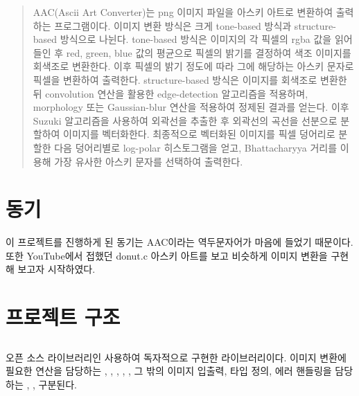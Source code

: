 \documentclass[conference]{IEEEtran}
\begin{document}
\maketitle

\begin{abstract}
AAC(Ascii Art Converter)는 png 이미지 파일을 아스키 아트로 변환하여 출력하는 프로그램이다.
이미지 변환 방식은 크게 tone-based 방식과 structure-based 방식으로 나뉜다.
tone-based 방식은 이미지의 각 픽셀의 rgba 값을 읽어들인 후 red, green, blue 값의 평균으로 픽셀의 밝기를 결정하여 색조 이미지를 회색조로 변환한다.
이후 픽셀의 밝기 정도에 따라 그에 해당하는 아스키 문자로 픽셀을 변환하여 출력한다.
structure-based 방식은 이미지를 회색조로 변환한 뒤 convolution 연산을 활용한 edge-detection 알고리즘을 적용하며, morphology 또는 Gaussian-blur 연산을 적용하여 정제된 결과를 얻는다.
이후 Suzuki 알고리즘을 사용하여 외곽선을 추출한 후 외곽선의 곡선을 선분으로 분할하여 이미지를 벡터화한다.
최종적으로 벡터화된 이미지를 픽셀 덩어리로 분할한 다음 덩어리별로 log-polar 히스토그램을 얻고, Bhattacharyya 거리를 이용해 가장 유사한 아스키 문자를 선택하여 출력한다.
\end{abstract}

\section{동기}
이 프로젝트를 진행하게 된 동기는 AAC이라는 역두문자어가 마음에 들었기 때문이다.
또한 YouTube에서 접했던 donut.c\cite[text]{keylist} 아스키 아트를 보고 비슷하게 이미지 변환을 구현해 보고자 시작하였다.

\section{프로젝트 구조}

\subsection{\eg}

 오픈 소스 라이브러리인   사용하여 독자적으로 구현한 라이브러리이다.
 이미지 변환에 필요한 연산을 담당하는 \egGeometry, \egMath, \egMethods, \egOperators, \egProcessing,  그 밖의 이미지 입출력, 타입 정의, 에러 핸들링을 담당하는 \egLoader, \egTypes,  구분된다.

\subsubsection{\egLoader}
\end{document}
